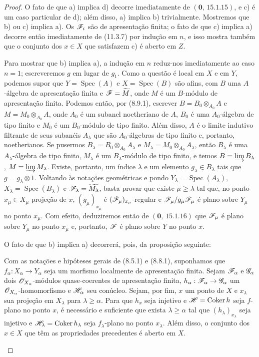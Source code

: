 \begin{proof}
O fato de que a) implica d) decorre imediatamente de
$(\mathbf 0,\,15.1.15)$, e c) é um caso particular de d);
além disso, a) implica b) trivialmente. Mostremos que
b) ou c) implica a). Os $\mathscr{F}_i$ são de apresentação
finita; o fato de que c) implica a) decorre então
imediatamente de (11.3.7) por indução em $n$, e isso
mostra também que o conjunto dos $x\in X$ que
satisfazem c) é aberto em $Z$.

Para mostrar que b) implica a), a indução em $n$
reduz-nos imediatamente ao caso $n=1$; escreveremos
$g$ em lugar de $g_1$. Como a questão é local em $X$
e em $Y$, podemos supor que
$Y=\operatorname{Spec}(A)$ e $X=\operatorname{Spec}(B)$
são afins, com $B$ uma $A$-álgebra de apresentação
finita e $\mathscr{F}=\widetilde M$, onde $M$ é um
$B$-módulo de apresentação finita.
Podemos então, por (8.9.1), escrever
$B=B_0\otimes_{A_0}A$ e $M=M_0\otimes_{A_0}A$,
onde $A_0$ é um subanel noetheriano de $A$,
$B_0$ é uma $A_0$-álgebra de tipo finito e
$M_0$ é um $B_0$-módulo de tipo finito.
Além disso, $A$ é o limite indutivo filtrante de
seus subanéis $A_\lambda$ que são $A_0$-álgebras
de tipo finito e, portanto, noetherianos.
Se pusermos $B_\lambda=B_0\otimes_{A_0}A_\lambda$
e $M_\lambda=M_0\otimes_{A_0}A_\lambda$,
então $B_\lambda$ é uma $A_\lambda$-álgebra de
tipo finito, $M_\lambda$ é um $B_\lambda$-módulo
de tipo finito, e temos $B=\varinjlim B_\lambda$,
$M=\varinjlim M_\lambda$. Existe, portanto, um
índice $\lambda$ e um elemento $g_\lambda\in B_\lambda$
tais que $g=g_\lambda\otimes1$.
Voltando às notações geométricas e pondo
$Y_\lambda=\operatorname{Spec}(A_\lambda)$,
$X_\lambda=\operatorname{Spec}(B_\lambda)$ e
$\mathscr{F}_\lambda=\widetilde{M_\lambda}$,
basta provar que existe $\mu\geq\lambda$ tal que,
no ponto $x_\mu\in X_\mu$ projeção de $x$,
$(g_\mu)_{x_\mu}$ é
$(\mathscr{F}_\mu)_{x_\mu}$-regular e
$\mathscr{F}_\mu/g_\mu\mathscr{F}_\mu$ é plano sobre
$Y_\mu$ no ponto $x_\mu$. Com efeito, deduziremos
então de $(\mathbf 0,\,15.1.16)$ que
$\mathscr{F}_\mu$ é plano sobre $Y_\mu$ no ponto
$x_\mu$ e, portanto, $\mathscr{F}$ é plano sobre
$Y$ no ponto $x$.

O fato de que b) implica a) decorrerá, pois, da
proposição seguinte:

\begin{proposition}[11.3.9]
\label{IV.11.3.9}
Com as notações e hipóteses gerais de (8.5.1) e
(8.8.1), suponhamos que
$f_\alpha:X_\alpha\to Y_\alpha$ seja um morfismo
localmente de apresentação finita. Sejam
$\mathscr{F}_\alpha$ e $\mathscr{G}_\alpha$ dois
$\mathscr{O}_{X_\alpha}$-módulos quase-coerentes de
apresentação finita,
$h_\alpha:\sh{F}_\alpha\to\sh{G}_\alpha$ um
$\mathscr{O}_{X_\alpha}$-homomorfismo e
$\mathscr{H}_\alpha$ seu conúcleo. Sejam, por fim, $x$
um ponto de $X$ e $x_\lambda$ sua projeção em
$X_\lambda$ para $\lambda\geq\alpha$.
Para que $h_x$ seja injetivo e
$\mathscr{H}=\operatorname{Coker}h$ seja $f$-plano no
ponto $x$, é necessário e suficiente que exista
$\lambda\geq\alpha$ tal que
$(h_\lambda)_{x_\lambda}$ seja injetivo e
$\mathscr{H}_\lambda=\operatorname{Coker}h_\lambda$
seja $f_\lambda$-plano no ponto $x_\lambda$.
Além disso, o conjunto dos $x\in X$ que têm
as propriedades precedentes é aberto em $X$.
\end{proposition}


\end{proof}
